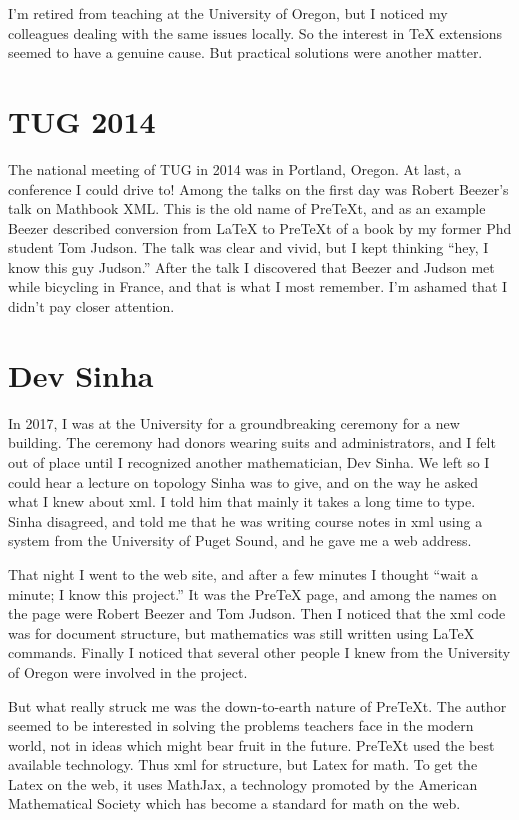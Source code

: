 \documentclass[11pt, oneside]{article}   	%
\begin{document}
I'm retired from teaching at the University of Oregon, but I noticed my colleagues dealing with the same issues locally. So the interest in TeX extensions seemed to have a genuine cause. But practical solutions were another matter.

\section{TUG 2014}

The national meeting of TUG in 2014 was in Portland, Oregon. At last, a conference I could drive to! Among the talks on the first day was Robert Beezer's talk on Mathbook XML. This is the old name of PreTeXt, and as an example Beezer described conversion from LaTeX to PreTeXt of a book by my former Phd student Tom Judson.
The talk was clear and vivid, but I kept thinking ``hey, I know this guy Judson.''
After the talk I discovered that Beezer and Judson met while bicycling in France, and that is what I most remember.  I'm ashamed that I didn't pay closer attention.

\section{Dev Sinha}
In 2017, I was at the University for a groundbreaking ceremony for a new building. The ceremony had donors wearing suits and administrators, and I felt out of place until I recognized another mathematician, Dev Sinha. We left so I could hear a lecture on topology Sinha was to give, and on the way he asked what I knew about xml. I told him that mainly it takes a long time to type. Sinha disagreed, and told me that he was writing course notes in xml using a system from the University of Puget Sound, and he gave me a web address.

That night I went to the web site, and after a few minutes I thought ``wait a minute; I know this project.''  It was the PreTeX page, and among the names on the page were Robert Beezer and Tom Judson. Then I noticed that the xml code was for document structure, but mathematics was still written using LaTeX commands. Finally I noticed that several other people I knew from the University of Oregon were involved in the project.

But what really struck me was the down-to-earth nature of PreTeXt. The author seemed to be interested in solving the problems teachers face in the modern world, not in ideas which might bear fruit in the future. PreTeXt used the best available technology. Thus xml for structure, but Latex for math. To get the Latex on the web, it uses MathJax, a technology promoted by the American Mathematical Society which has become a standard for math on the web.
\end{document}
